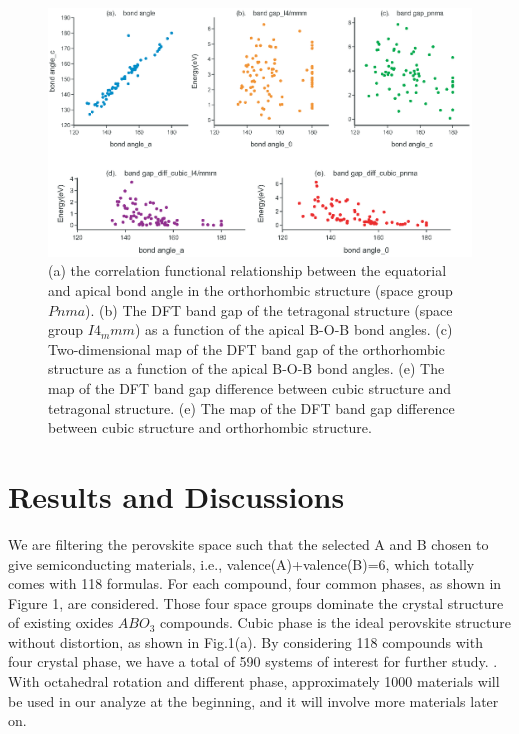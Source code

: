 \documentclass[%
twocolumn,
 amsmath,amssymb,
 aps, citeautoscript,
prb,
]{revtex4-1}
\begin{document}
\begin{figure}[ht!]
\begin{center}
\includegraphics[width=6.0in]{Figures/Fig3.eps}
\end{center}
\caption{ (a) the correlation functional relationship between the equatorial and apical bond angle in the orthorhombic structure (space group $Pnma$).
(b) The DFT band gap of the tetragonal structure (space group $I4_mmm$) as a function of the apical B-O-B bond angles. 
(c) Two-dimensional map of the DFT band gap of the orthorhombic structure as a function of the apical B-O-B bond angles. 
(e) The map of the DFT band gap difference between cubic structure and tetragonal structure. 
(e) The map of the DFT band gap difference between cubic structure and orthorhombic structure. 
}
\label{fig1}
\end{figure}


\section{Results and Discussions}

We are filtering the perovskite space such that the selected A and B chosen to give semiconducting materials, i.e., valence(A)+valence(B)=6, which totally comes with 118 formulas.
For each compound, four common phases, as shown in Figure 1, are considered. Those four space groups dominate the crystal structure of existing oxides $ABO_{3}$ compounds. Cubic phase is the ideal perovskite structure without distortion, as shown in Fig.1(a). By considering 118 compounds with four crystal phase, we have a total of 590 systems of interest for further study.
. With octahedral rotation and different phase, approximately 1000 materials will be used in our analyze at the beginning, and it will involve more materials later on.
\end{document}

